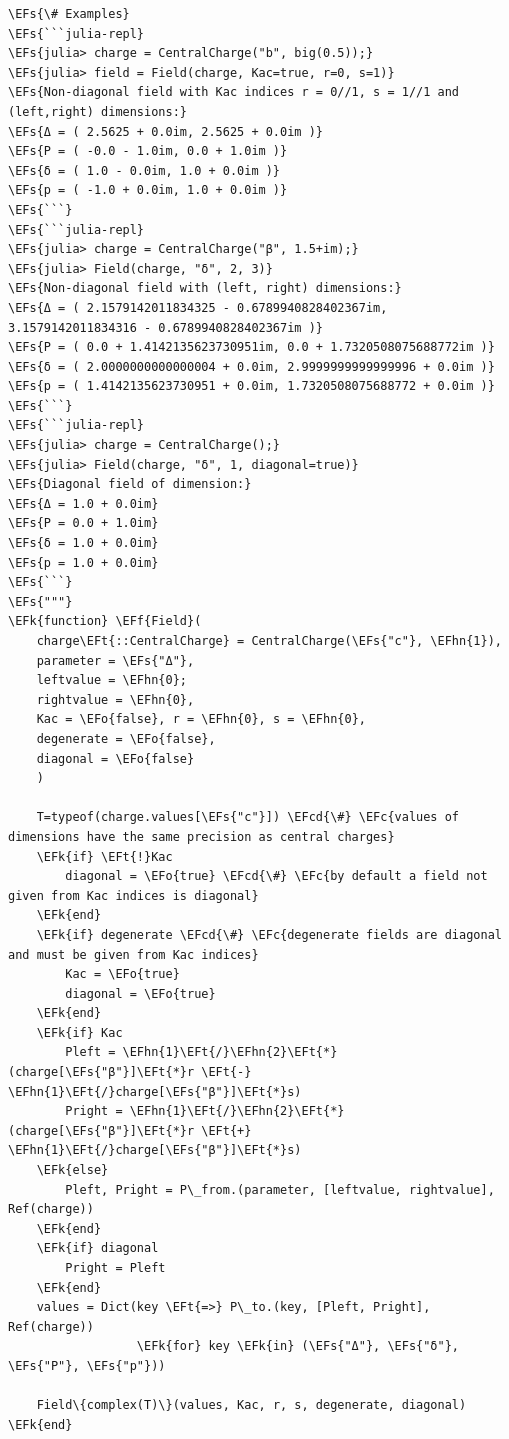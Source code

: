 \documentclass[a4paper]{article}
\numberwithin{equation}{section}
\newcommand{\EFc}[1]{\textcolor{EFc}{#1}} %
\newcommand{\EFcd}[1]{\textcolor{EFcd}{#1}} %
\newcommand{\EFs}[1]{\textcolor{EFs}{#1}} %
\newcommand{\EFk}[1]{\textcolor{EFk}{#1}} %
\newcommand{\EFf}[1]{\textcolor{EFf}{#1}} %
\newcommand{\EFt}[1]{\textcolor{EFt}{#1}} %
\newcommand{\EFo}[1]{\textcolor{EFo}{#1}} %
\newcommand{\EFhn}[1]{\textcolor{EFhn}{#1}} %
\begin{document}
\begin{Code}
\begin{Verbatim}
\EFs{\# Examples}
\EFs{```julia-repl}
\EFs{julia> charge = CentralCharge("b", big(0.5));}
\EFs{julia> field = Field(charge, Kac=true, r=0, s=1)}
\EFs{Non-diagonal field with Kac indices r = 0//1, s = 1//1 and (left,right) dimensions:}
\EFs{Δ = ( 2.5625 + 0.0im, 2.5625 + 0.0im )}
\EFs{P = ( -0.0 - 1.0im, 0.0 + 1.0im )}
\EFs{δ = ( 1.0 - 0.0im, 1.0 + 0.0im )}
\EFs{p = ( -1.0 + 0.0im, 1.0 + 0.0im )}
\EFs{```}
\EFs{```julia-repl}
\EFs{julia> charge = CentralCharge("β", 1.5+im);}
\EFs{julia> Field(charge, "δ", 2, 3)}
\EFs{Non-diagonal field with (left, right) dimensions:}
\EFs{Δ = ( 2.1579142011834325 - 0.6789940828402367im, 3.1579142011834316 - 0.6789940828402367im )}
\EFs{P = ( 0.0 + 1.4142135623730951im, 0.0 + 1.7320508075688772im )}
\EFs{δ = ( 2.0000000000000004 + 0.0im, 2.9999999999999996 + 0.0im )}
\EFs{p = ( 1.4142135623730951 + 0.0im, 1.7320508075688772 + 0.0im )}
\EFs{```}
\EFs{```julia-repl}
\EFs{julia> charge = CentralCharge();}
\EFs{julia> Field(charge, "δ", 1, diagonal=true)}
\EFs{Diagonal field of dimension:}
\EFs{Δ = 1.0 + 0.0im}
\EFs{P = 0.0 + 1.0im}
\EFs{δ = 1.0 + 0.0im}
\EFs{p = 1.0 + 0.0im}
\EFs{```}
\EFs{"""}
\EFk{function} \EFf{Field}(
    charge\EFt{::CentralCharge} = CentralCharge(\EFs{"c"}, \EFhn{1}),
    parameter = \EFs{"Δ"},
    leftvalue = \EFhn{0};
    rightvalue = \EFhn{0},
    Kac = \EFo{false}, r = \EFhn{0}, s = \EFhn{0},
    degenerate = \EFo{false},
    diagonal = \EFo{false}
    )

    T=typeof(charge.values[\EFs{"c"}]) \EFcd{\#} \EFc{values of dimensions have the same precision as central charges}
    \EFk{if} \EFt{!}Kac
        diagonal = \EFo{true} \EFcd{\#} \EFc{by default a field not given from Kac indices is diagonal}
    \EFk{end}
    \EFk{if} degenerate \EFcd{\#} \EFc{degenerate fields are diagonal and must be given from Kac indices}
        Kac = \EFo{true}
        diagonal = \EFo{true}
    \EFk{end}
    \EFk{if} Kac
        Pleft = \EFhn{1}\EFt{/}\EFhn{2}\EFt{*}(charge[\EFs{"β"}]\EFt{*}r \EFt{-} \EFhn{1}\EFt{/}charge[\EFs{"β"}]\EFt{*}s)
        Pright = \EFhn{1}\EFt{/}\EFhn{2}\EFt{*}(charge[\EFs{"β"}]\EFt{*}r \EFt{+} \EFhn{1}\EFt{/}charge[\EFs{"β"}]\EFt{*}s)
    \EFk{else}
        Pleft, Pright = P\_from.(parameter, [leftvalue, rightvalue], Ref(charge))
    \EFk{end}
    \EFk{if} diagonal
        Pright = Pleft
    \EFk{end}
    values = Dict(key \EFt{=>} P\_to.(key, [Pleft, Pright], Ref(charge))
                  \EFk{for} key \EFk{in} (\EFs{"Δ"}, \EFs{"δ"}, \EFs{"P"}, \EFs{"p"}))

    Field\{complex(T)\}(values, Kac, r, s, degenerate, diagonal)
\EFk{end}


\end{Verbatim}
\end{Code}
\end{document}
